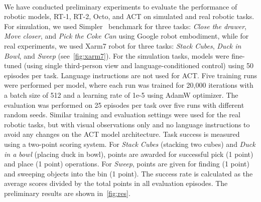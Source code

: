 \\
We have conducted preliminary experiments to evaluate the performance of robotic models, \ie RT-1, RT-2, Octo, and ACT on simulated and real robotic tasks. 
For simulation, we used Simpler~\cite{li24simpler} benchmark for three tasks: \emph{Close the drawer}, \emph{Move closer}, and \emph{Pick the Coke Can} using Google robot embodiment, while for real experiments, we used Xarm7 robot for three tasks: \emph{Stack Cubes}, \emph{Duck in Bowl}, and \emph{Sweep} (see~\autoref{fig:xarm7}).
For the simulation tasks, models were fine-tuned (using single third-person view and language-conditioned control) using 50 episodes per task. Language instructions are not used for ACT. Five training runs were performed per model, where each run was trained for 20,000 iterations with a batch size of 512 and a learning rate of 1e-5 using AdamW optimizer. The evaluation was performed on 25 episodes per task over five runs with different random seeds.
Similar training and evaluation settings were used for the real robotic tasks, but with visual observations only and no language instructions to avoid any changes on the ACT model architecture. 
Task success is measured using a two-point scoring system. For \emph{Stack Cubes} (stacking two cubes) and \emph{Duck in a bowl} (placing duck in bowl), points are awarded for successful pick (1 point) and place (1 point) operations. For \emph{Sweep}, points are given for finding (1 point) and sweeping objects into the bin (1 point). The success rate is calculated as the average scores divided by the total points in all evaluation episodes.
The preliminary results are shown in~\autoref{fig:res}.

